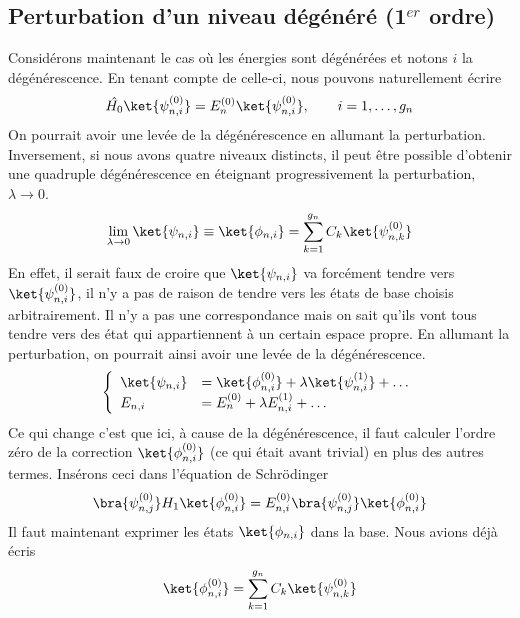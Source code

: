	\subsection{Perturbation d'un niveau dégénéré (1$^{er}$ ordre)}
	Considérons maintenant le cas où les énergies sont dégénérées et notons $i$ la 
	dégénérescence. En tenant compte de celle-ci, nous pouvons naturellement écrire
	\begin{equation}
	\hat{H_0}\ket{\psi_{n,i}^{(0)}} = E_n^{(0)}\ket{\psi_{n,i}^{(0)}},\qquad i=1,\dots, g_n
	\end{equation}
	On pourrait avoir une levée de la dégénérescence en allumant la 
	perturbation. Inversement, si nous avons quatre niveaux distincts, il peut être possible 
	d'obtenir une quadruple dégénérescence en éteignant progressivement la perturbation, 
	$\lambda\to 0$.
	\begin{equation}
	\lim\limits_{\lambda\to 0} \ket{\psi_{n,i}} \equiv \ket{\phi_{n,i}} = \sum_{k=1}^{g_n} C_k 
	\ket{\psi_{n,k}^{(0)}}
	\end{equation}
	En effet, il serait faux de croire que $\ket{\psi_{n,i}}$ va forcément tendre vers 
	$\ket{\psi_{n,i}^{(0)}}$, il n'y a pas de raison de tendre vers les états de base 
	choisis arbitrairement. Il n'y a pas une correspondance mais on sait qu'ils vont 
	tous tendre vers des état qui appartiennent à un certain espace propre. En allumant 
	la perturbation, on pourrait ainsi avoir une levée de la dégénérescence.	
	\begin{equation}
	\left\{\begin{array}{ll}
	\ket{\psi_{n,i}} &= \ket{\phi_{n,i}^{(0)}} + \lambda\ket{\psi_{n,i}^{(1)}} + \dots\\
	E_{n,i} &= E_n^{(0)} + \lambda E_{n,i}^{(1)} + \dots
	\end{array}\right.
	\end{equation}
	Ce qui change c'est que ici, à cause de la dégénérescence, il faut calculer l'ordre
	zéro de la correction $\ket{\phi_{n,i}^{(0)}}$ (ce qui était avant trivial) en plus 
	des autres termes. Insérons ceci dans l'équation de Schrödinger
	\begin{equation}
	\bra{\psi_{n,j}^{(0)}}H_1\ket{\phi_{n,i}^{(0)}} = E_{n,i}^{(0)}
	\bra{\psi_{n,j}^{(0)}}\ket{\phi_{n,i}^{(0)}}
	\end{equation}
	Il faut maintenant exprimer les états $\ket{\phi_{n,i}}$ dans la base. Nous avions déjà 
	écris	
	\begin{equation}
	\ket{\phi_{n,i}^{(0)}} = \sum_{k=1}^{g_n} C_k \ket{\psi_{n,k}^{(0)}}
	\end{equation}
